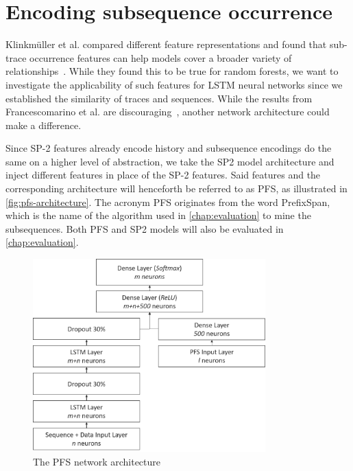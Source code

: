 \section{Encoding subsequence occurrence}
\label{sec:contrib:pfs-inspiration}
Klinkmüller et al. compared different feature representations and found that sub-trace occurrence features can help models cover a broader variety of relationships~\cite{klinkmuller2018reliablemonitoring}. While they found this to be true for random forests, we want to investigate the applicability of such features for LSTM neural networks since we established the similarity of traces and sequences. While the results from Francescomarino et al. are discouraging~\cite{francescomarino2017}, another network architecture could make a difference.

Since SP-2 features already encode history and subsequence encodings do the same on a higher level of abstraction, we take the SP2 model architecture and inject different features in place of the SP-2 features. Said features and the corresponding architecture will henceforth be referred to as PFS, as illustrated in \autoref{fig:pfs-architecture}. The acronym PFS originates from the word PrefixSpan, which is the name of the algorithm used in \autoref{chap:evaluation} to mine the subsequences. Both PFS and SP2 models will also be evaluated in \autoref{chap:evaluation}.

\begin{figure}[ht]
    \centering
    \includegraphics[width=0.8\textwidth]{gfx/pfs-network-architecture.png}
    \caption{The PFS network architecture}
    \label{fig:pfs-architecture}
\end{figure}
